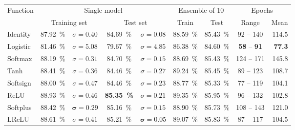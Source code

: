 \begin{table}[H]
    \centering
    \setlength\tabcolsep{1.5pt}
    \begin{tabular}{@{\extracolsep{4pt}}lcccccccr@{}}
    \toprule
    \multirow{2}{*}{Function} & \multicolumn{4}{c}{Single model}              & \multicolumn{2}{c}{Ensemble of 10} & \multicolumn{2}{c}{Epochs}\\\cline{2-5}\cline{6-7}\cline{8-9}
                              & \multicolumn{2}{c}{Training set}     &\multicolumn{2}{c}{Test set}                  & Train                & Test                 & Range     & \multicolumn{1}{c}{Mean} \\\midrule
    Identity                  & \SI{87.92}{\percent} & $\sigma=0.40$ & \SI{84.69}{\percent} & $\sigma=0.08$         & \SI{88.59}{\percent} & \SI{85.43}{\percent} & \hphantom{0}92 -- 140 & 114.5\\%
    Logistic                  & \SI{81.46}{\percent} & $\sigma=5.08$ & \SI{79.67}{\percent} & $\sigma=4.85$         & \SI{86.38}{\percent} & \SI{84.60}{\percent} & \hphantom{0}\textbf{58} -- \hphantom{0}\textbf{91}  & \textbf{77.3}\\
    Softmax                   & \SI{88.19}{\percent} & $\sigma=0.31$ & \SI{84.70}{\percent} & $\sigma=0.15$         & \SI{88.69}{\percent} & \SI{85.43}{\percent} & 124 -- 171& 145.8\\
    Tanh                      & \SI{88.41}{\percent} & $\sigma=0.36$ & \SI{84.46}{\percent} & $\sigma=0.27$         & \SI{89.24}{\percent} & \SI{85.45}{\percent} & \hphantom{0}89 -- 123 & 108.7\\
    Softsign                  & \SI{88.00}{\percent} & $\sigma=0.47$ & \SI{84.46}{\percent} & $\sigma=0.23$         & \SI{88.77}{\percent} & \SI{85.33}{\percent} & \hphantom{0}77 -- 119 & 104.1\\
    \gls{ReLU}                & \SI{88.93}{\percent} & $\sigma=0.46$ & \textbf{\SI{85.35}{\percent}} & $\sigma=0.21$         & \SI{89.35}{\percent} & \SI{85.95}{\percent} & \hphantom{0}96 -- 132 & 102.8\\
    Softplus                  & \SI{88.42}{\percent} & $\boldsymbol{\sigma=0.29}$ & \SI{85.16}{\percent} & $\sigma=0.15$         & \SI{88.90}{\percent} & \SI{85.73}{\percent} &            108 -- 143 & 121.0\\
    \gls{LReLU}               & \SI{88.61}{\percent} & $\sigma=0.41$ & \SI{85.21}{\percent} & $\boldsymbol{\sigma=0.05}$         & \SI{89.07}{\percent} & \SI{85.83}{\percent} & \hphantom{0}87 -- 117 & 104.5\\

\end{tabular}
\end{table}

